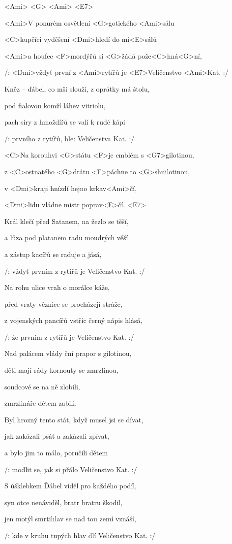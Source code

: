 

<Ami>	<G>	<Ami>	<E7>

\zs
<Ami>V ponurém osvětlení <G>gotického <Ami>sálu

<C>kupčíci vyděšení <Dmi>hledí do mi<E>sálů

<Ami>a houfec <F>mordýřů si <G>žádá pože<C>hná<G>ní,

/: <Dmi>vždyť první z <Ami>rytířů je <E7>Veličenstvo <Ami>Kat. :/
\ks

\zs
Kněz -- ďábel, co mši slouží, z oprátky má štolu,

pod fialovou komží láhev vitriolu,

pach síry z hmoždířů se valí k rudé kápi

/: prvního z rytířů, hle: Veličenstva Kat. :/
\ks

\zr
<C>Na korouhvi <G>státu <F>je emblém s <G7>gilotinou,

z <C>ostnatého <G>drátu <F>páchne to <G>shnilotinou,

v <Dmi>kraji hnízdí hejno krkav<Ami>čí,

<Dmi>lidu vládne mistr poprav<E>čí. <E7>
\kr

\zs
Král klečí před Satanem, na žezlo se těší,

a lůza pod platanem radu moudrých věší

a zástup kacířů se raduje a jásá,

/: vždyť prvním z rytířů je Veličenstvo Kat. :/
\ks

\zs
Na rohu ulice vrah o morálce káže,

před vraty věznice se procházejí stráže,

z vojenských pancířů vstříc černý nápis hlásá,

/: že prvním z rytířů je Veličenstvo Kat. :/
\ks

\zr
Nad palácem vlády ční prapor s gilotinou,

děti mají rády kornouty se zmrzlinou,

soudcové se na ně zlobili,

zmrzlináře dětem zabili.
\kr

\zs
Byl hrozný tento stát, když musel jsi se dívat,

jak zakázali psát a zakázali zpívat,

a bylo jim to málo, poručili dětem

/: modlit se, jak si přálo Veličenstvo Kat. :/
\ks

\zs
S úšklebkem Ďábel viděl pro každého podíl,

syn otce nenáviděl, bratr bratru škodil,

jen motýl smrtihlav se nad tou zemí vznáší,

/: kde v kruhu tupých hlav dlí Veličenstvo Kat. :/
\ks

\kp
